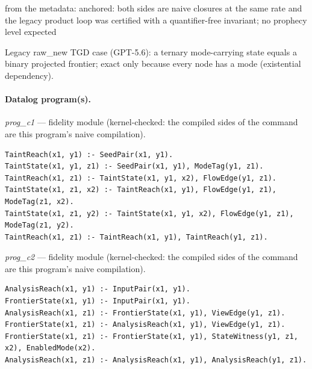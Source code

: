 \documentclass[10pt]{article}
\begin{document}
\begin{description}[leftmargin=2.6cm,style=nextline,itemsep=1pt]
\item[Obstruction note] from the metadata: anchored: both sides are naive closures at the same rate and the legacy product loop was certified with a quantifier-free invariant; no prophecy level expected

\item[Note] Legacy raw\_new TGD case (GPT-5.6): a ternary mode-carrying state equals a binary projected frontier; exact only because every node has a mode (existential dependency).

\end{description}

\paragraph{Datalog program(s).}

{\raggedright\textit{prog\_c1} --- fidelity module (kernel-checked: the compiled sides of the command are this program's naive compilation).\par}

\begin{Verbatim}[fontsize=\scriptsize,breaklines=true,breakanywhere=true,frame=single,framesep=1.5mm]
TaintReach(x1, y1) :- SeedPair(x1, y1).
TaintState(x1, y1, z1) :- SeedPair(x1, y1), ModeTag(y1, z1).
TaintReach(x1, z1) :- TaintState(x1, y1, x2), FlowEdge(y1, z1).
TaintState(x1, z1, x2) :- TaintReach(x1, y1), FlowEdge(y1, z1), ModeTag(z1, x2).
TaintState(x1, z1, y2) :- TaintState(x1, y1, x2), FlowEdge(y1, z1), ModeTag(z1, y2).
TaintReach(x1, z1) :- TaintReach(x1, y1), TaintReach(y1, z1).
\end{Verbatim}

{\raggedright\textit{prog\_c2} --- fidelity module (kernel-checked: the compiled sides of the command are this program's naive compilation).\par}

\begin{Verbatim}[fontsize=\scriptsize,breaklines=true,breakanywhere=true,frame=single,framesep=1.5mm]
AnalysisReach(x1, y1) :- InputPair(x1, y1).
FrontierState(x1, y1) :- InputPair(x1, y1).
AnalysisReach(x1, z1) :- FrontierState(x1, y1), ViewEdge(y1, z1).
FrontierState(x1, z1) :- AnalysisReach(x1, y1), ViewEdge(y1, z1).
FrontierState(x1, z1) :- FrontierState(x1, y1), StateWitness(y1, z1, x2), EnabledMode(x2).
AnalysisReach(x1, z1) :- AnalysisReach(x1, y1), AnalysisReach(y1, z1).
\end{Verbatim}
\end{document}
